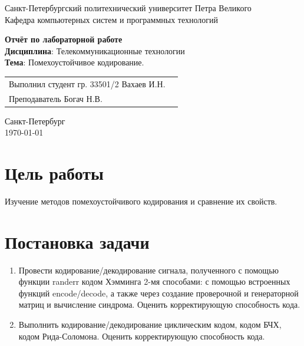 \documentclass[a4paper,14pt]{extarticle}
\begin{document}
\begin{titlepage}
\centering
Санкт-Петербургский политехнический университет Петра Великого \\
\vspace{0.15cm}
Кафедра компьютерных систем и программных технологий \\
\vspace{6.5cm}

{\centering \textbf{Отчёт по лабораторной работе} \\ 
\vspace{0.15cm}
\textbf{Дисциплина}: Телекоммуникационные технологии \\
\vspace{0.15cm}
\textbf{Тема}: Помехоустойчивое кодирование.} \\


\vspace{6.5cm}

\begin{table}[H]
\begin{tabular}{p{\textwidth}@{}r}
{Выполнил студент гр. 33501/2} \hfill {Вахаев И.Н.} \\
{Преподаватель} \hfill {Богач Н.В.} \\
\end{tabular}
\end{table}
\vfill

{\centering Санкт-Петербург \\ 
\vspace{0.15cm}
\today}
\end{titlepage}

\tableofcontents

\newpage

\section{Цель работы}

Изучение методов помехоустойчивого кодирования и сравнение их свойств.

\section{Постановка задачи}

\begin{enumerate}
\item Провести кодирование/декодирование сигнала, полученного с помощью функции randerr кодом Хэмминга 2-мя способами: с помощью встроенных функций encode/decode, а также через создание проверочной и генераторной матриц и вычисление синдрома. Оценить корректирующую способность кода.

\item Выполнить кодирование/декодирование циклическим кодом, кодом БЧХ, кодом Рида-Соломона. Оценить корректирующую способность кода.


\end{enumerate}
\end{document}

